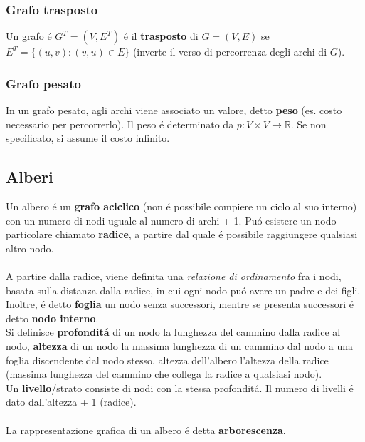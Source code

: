 \documentclass{article}
\begin{document}
\subsubsection{Grafo trasposto}
Un grafo é $G^T = (V,E^T)$ é il \textbf{trasposto} di $G = (V,E)$ se $E^T = \{(u,v):(v,u) \in E\}$ (inverte il verso di percorrenza degli archi di $G$).

\subsubsection{Grafo pesato}
In un grafo pesato, agli archi viene associato un valore, detto \textbf{peso} (es. costo necessario per percorrerlo). Il peso é determinato da $p : V \times V \to \mathbb{R}$. Se non specificato, si assume il costo infinito.

\subsection{Alberi}
Un albero é un \textbf{grafo aciclico} (non é possibile compiere un ciclo al suo interno) con un numero di nodi uguale al numero di archi + 1. Puó esistere un nodo particolare chiamato \textbf{radice}, a partire dal quale é possibile raggiungere qualsiasi altro nodo.\\\\
A partire dalla radice, viene definita una \textit{relazione di ordinamento} fra i nodi, basata sulla distanza dalla radice, in cui ogni nodo puó avere un padre e dei figli. Inoltre, é detto \textbf{foglia} un nodo senza successori, mentre se presenta successori é detto \textbf{nodo interno}.\\
Si definisce \textbf{profonditá} di un nodo la lunghezza del cammino dalla radice al nodo, \textbf{altezza} di un nodo la massima lunghezza di un cammino dal nodo a una foglia discendente dal nodo stesso, altezza dell'albero l'altezza della radice (massima lunghezza del cammino che collega la radice a qualsiasi nodo).\\
Un \textbf{livello}/strato consiste di nodi con la stessa profonditá. Il numero di livelli é dato dall'altezza + 1 (radice).\\\\
La rappresentazione grafica di un albero é detta \textbf{arborescenza}.
\end{document}
